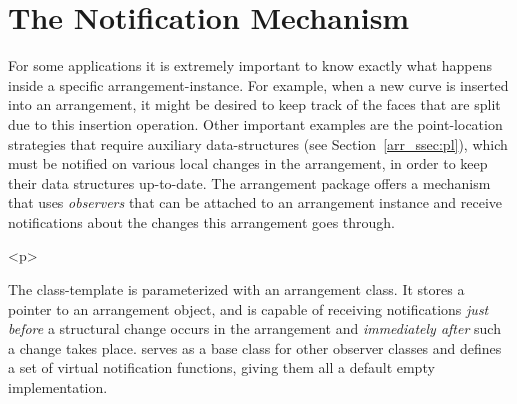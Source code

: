\section{The Notification Mechanism}
\label{arr_sec:notif}
%
For some applications it is extremely important to know exactly what
happens inside a specific arrangement-instance. For example, when
a new curve is inserted into an arrangement, it might be desired to keep
track of the faces that are split due to this insertion operation.
Other important examples are the point-location strategies that
require auxiliary data-structures (see Section~\ref{arr_ssec:pl}),
which must be notified on various local changes in the arrangement,
in order to keep their data structures up-to-date. The arrangement
package offers a mechanism that uses {\em observers} that can be
attached to an arrangement instance and receive notifications
about the changes this arrangement goes through.

\begin{ccHtmlOnly}<p>\end{ccHtmlOnly}
The  class-template is
parameterized with an arrangement class. It stores a pointer to an
arrangement object, and is capable of receiving notifications {\em
just before} a structural change occurs in the arrangement and
{\em immediately after} such a change takes place.
 serves as a base class for other observer
classes and defines a set of virtual notification functions,
giving them all a default empty implementation.

